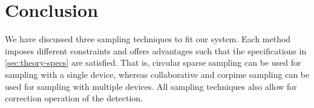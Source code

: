 \documentclass[a4paper, openany, oneside]{memoir}
\begin{document}
\section{Conclusion}
We have discussed three sampling techniques to fit our system. Each method imposes different constraints and offers advantages such that the specifications in \cref{sec:theory-specs} are satisfied. That is, circular sparse sampling can be used for sampling with a single device, whereas collaborative and corpime sampling can be used for sampling with multiple devices.  All sampling techniques also allow for correction operation of the detection.
\end{document}
